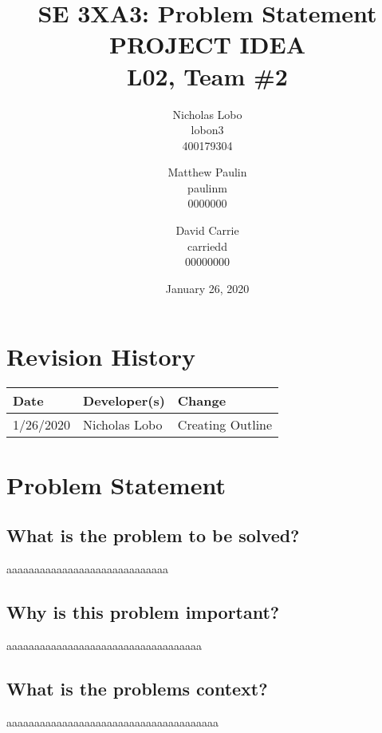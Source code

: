 \documentclass{article}
\title{SE 3XA3: Problem Statement \\  PROJECT IDEA  \\{\large L02, Team \#2}}
\author{Nicholas Lobo \\ lobon3 \\ 400179304 \and
		Matthew Paulin \\ paulinm \\ 0000000 \and
		David Carrie \\ carriedd \\   00000000 \and
}
\date{January 26, 2020}
\begin{document}
\maketitle
\newpage

\tableofcontents
\newpage



\begin{table}[hp]
\section{Revision History} \label{TblRevisionHistory}
\begin{tabularx}{\textwidth}{llX}
\hline
\textbf{Date} & \textbf{Developer(s)} & \textbf{Change}\\
\hline
1/26/2020 & Nicholas Lobo & Creating Outline\\

\hline
\end{tabularx}
\end{table}

\newpage

\section{Problem Statement}
\subsection{What is the problem to be solved?}

aaaaaaaaaaaaaaaaaaaaaaaaaaaaa

\subsection{Why is this problem important?}


aaaaaaaaaaaaaaaaaaaaaaaaaaaaaaaaaaa

\subsection{What is the problems context?}

aaaaaaaaaaaaaaaaaaaaaaaaaaaaaaaaaaaaaa
\end{document}
